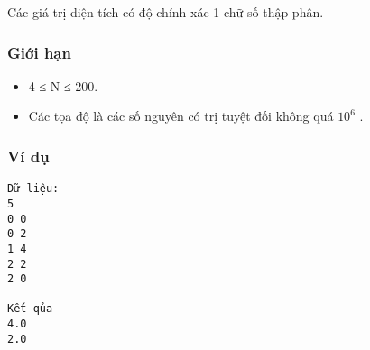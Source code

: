    Các giá trị diện tích có độ chính xác 1 chữ số thập phân.  

\subsubsection{   Giới hạn  }
\begin{itemize}
	\item     4 ≤ N ≤ 200.   
	\item     Các tọa độ là các số nguyên có trị tuyệt đối không quá $10^{6}$    .   
\end{itemize}

\subsubsection{   Ví dụ  }
\begin{verbatim}
Dữ liệu:
5
0 0
0 2
1 4
2 2
2 0

Kết qủa
4.0
2.0
\end{verbatim}
